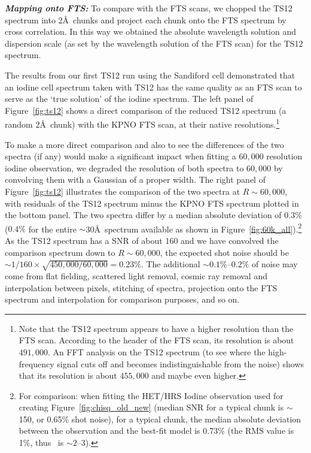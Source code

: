 \textbf{\textit{Mapping onto FTS:}} To compare with the FTS
scans, we chopped the TS12 spectrum into 2\AA\ chunks and project
each chunk onto the FTS spectrum by cross correlation. In this way we
obtained the absolute wavelength solution and dispersion scale (as set
by the wavelength solution of the FTS scan) for the TS12
spectrum.

The results from our first TS12 run using the Sandiford cell
demonstrated that an iodine cell spectrum taken with TS12 has the same
quality as an FTS scan to serve as the `true solution' of the iodine
spectrum. The left panel of Figure~\ref{fig:ts12} shows a direct
comparison of the reduced TS12 spectrum (a random 2\AA\ chunk) with
the KPNO FTS scan, at their native resolutions.\footnote{Note that the
TS12 spectrum appears to have a higher resolution than the FTS
scan. According to the header of the FTS scan, its resolution is about
$491,000$. An FFT analysis on the TS12 spectrum (to see where the
high-frequency signal cuts off and becomes indistinguishable from the
noise) shows that its resolution is about $455,000$ and maybe even
higher.}

To make a more direct comparison and also to see the differences of
the two spectra (if any) would make a significant impact when fitting
a $60,000$ resolution iodine observation, we degraded the resolution
of both spectra to $60,000$ by convolving them with a Gaussian of a
proper width. The right panel of Figure~\ref{fig:ts12} illustrates the
comparison of the two spectra at $R\sim60,000$, with residuals of the
TS12 spectrum minus the KPNO FTS spectrum plotted in the bottom
panel. The two spectra differ by a median absolute deviation of 0.3\%
($0.4\%$ for the entire $\sim$30\AA\ spectrum available as shown in
Figure~\ref{fig:60k_all}).\footnote{ For comparison: when fitting the
HET/HRS Iodine observation used for creating
Figure~\ref{fig:chisq_old_new} (median SNR for a typical chunk is
$\sim$150, or 0.65\% shot noise), for a typical chunk, the median
absolute deviation between the observation and the best-fit model is
0.73\% (the RMS value is 1\%, thus \chisq\ is $\sim 2$--$3$).  } As
the TS12 spectrum has a SNR of about 160 and we have convolved the
comparison spectrum down to $R\sim60,000$, the expected shot noise
should be $\sim 1/160\times \sqrt{450,000/60,000}=0.23\%$. The
additional $\sim 0.1\%$--$0.2\%$ of noise may come from flat fielding,
scattered light removal, cosmic ray removal and interpolation between
pixels, stitching of spectra, projection onto the FTS spectrum and
interpolation for comparison purposes, and so on.


